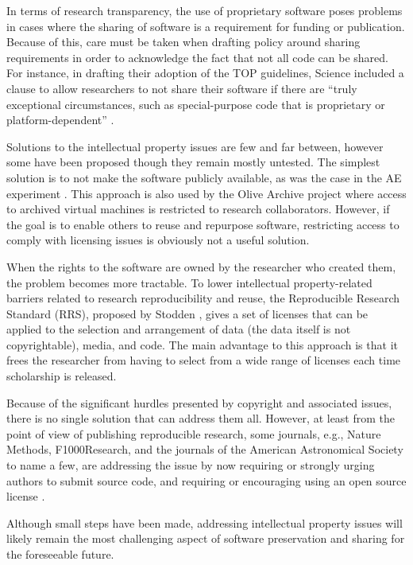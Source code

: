 \documentclass[letterpaper,11pt]{article}
\begin{document}
In terms of research transparency, the use of proprietary software poses problems in cases where the sharing of software is a requirement for funding or publication. Because of this, care must be taken when drafting policy around sharing requirements in order to acknowledge the fact that not all code can be shared. For instance, in drafting their adoption of the TOP guidelines, Science included a clause to allow researchers to not share their software if there are ``truly exceptional circumstances, such as special-purpose code that is proprietary or platform-dependent'' \citep{mcnutt2016}.

Solutions to the intellectual property issues are few and far between, however some have been proposed \citep{mckeehan2016} though they remain mostly untested. The simplest solution is to not make the software publicly available, as was the case in the AE experiment \citep{krishnamurthi2013}. This approach is also used by the Olive Archive project where access to archived virtual machines is restricted to research collaborators. However, if the goal is to enable others to reuse and repurpose software, restricting access to comply with licensing issues is obviously not a useful solution. 

When the rights to the software are owned by the researcher who created them, the problem becomes more tractable. To lower intellectual property-related barriers related to research reproducibility and reuse, the Reproducible Research Standard (RRS), proposed by Stodden \citep{stodden2009}, gives a set of licenses that can be applied to the selection and arrangement of data (the data itself is not copyrightable), media, and code. The main advantage to this approach is that it frees the researcher from having to select from a wide range of licenses each time scholarship is released.

Because of the significant hurdles presented by copyright and associated issues, there is no single solution that can address them all. However, at least from the point of view of publishing reproducible research, some journals, e.g., Nature Methods, F1000Research, and the journals of the American Astronomical Society to name a few, are addressing the issue by now requiring or strongly urging authors to submit source code, and requiring or encouraging using an open source license \citep{evanko2014,ingraham2015,aas2016}. 

Although small steps have been made, addressing intellectual property issues will likely remain the most challenging aspect of software preservation and sharing for the foreseeable future.
\end{document}
